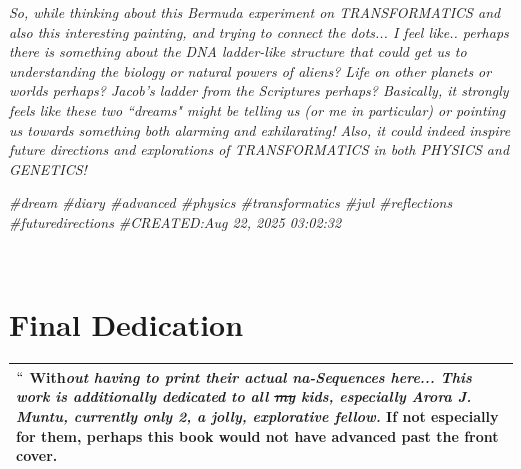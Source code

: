 \documentclass[a4paper, 18pt]{book} %
\newcommand{\comment}[1]{}
\begin{document}
\begin{appendices}
\textit{So, while thinking about this Bermuda experiment on TRANSFORMATICS and also this interesting painting, and trying to connect the dots... I feel like.. perhaps there is something about the DNA ladder-like structure that could get us to understanding the biology or natural powers of aliens? Life on other planets or worlds perhaps? Jacob's ladder from the Scriptures perhaps? Basically, it strongly feels like these two ``dreams" might be telling us (or me in particular) or pointing us towards something both alarming and exhilarating! Also, it could indeed inspire future directions and explorations of TRANSFORMATICS in both PHYSICS and GENETICS!}


\textit{\#dream \#diary \#advanced \#physics \#transformatics \#jwl \#reflections \#futuredirections
\#CREATED:Aug 22, 2025 03:02:32}

\Large



\end{appendices}








\vspace{5cm}
\\




\chapter*{Final Dedication}


\begin{table}[H]
  \centering
  \Huge
	\begin{tabular}[t]{|p{}}
$   ``$ \textbf{With}\textit{out having to print their actual \textbf{na-Sequences} here...    \Large This work is additionally dedicated to all \st{my} kids, especially  \textbf{Arora J. Muntu}, currently only 2, a jolly, explorative fellow.} If not especially for them, perhaps this \textbf{book would not have advanced past the front cover.}\\
	\hline
	              
\end{tabular}
  \label{TABFINDEDC}
\end{table}
\end{document}
